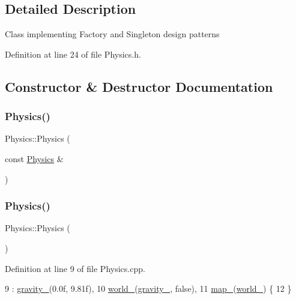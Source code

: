 \subsection{Detailed Description}
Class implementing Factory and Singleton design patterns 

Definition at line 24 of file Physics.\+h.



\subsection{Constructor \& Destructor Documentation}
\mbox{\label{classPhysics_a6fe4747c42265cefae8a24b9a2a291ad}} 
\subsubsection{\texorpdfstring{Physics()}{Physics()}\hspace{0.1cm}{\footnotesize\ttfamily [1/2]}}
{\footnotesize\ttfamily Physics\+::\+Physics (\begin{DoxyParamCaption}\item[{const \hyperlink{classPhysics}{Physics} \&}]{ }\end{DoxyParamCaption})\hspace{0.3cm}{\ttfamily [delete]}}

\mbox{\label{classPhysics_a4b2ebc0a344f04f48d227c72f0d0fbda}} 
\subsubsection{\texorpdfstring{Physics()}{Physics()}\hspace{0.1cm}{\footnotesize\ttfamily [2/2]}}
{\footnotesize\ttfamily Physics\+::\+Physics (\begin{DoxyParamCaption}{ }\end{DoxyParamCaption})\hspace{0.3cm}{\ttfamily [private]}}



Definition at line 9 of file Physics.\+cpp.


\begin{DoxyCode}
9                  : \hyperlink{classPhysics_a458f9e43685bda01b57e001b9793aed4}{gravity\_}(0.0f, 9.81f),
10                       \hyperlink{classPhysics_a6f9efee327d116528efb9fd16b405bc6}{world\_}(\hyperlink{classPhysics_a458f9e43685bda01b57e001b9793aed4}{gravity\_}, \textcolor{keyword}{false}),
11                       \hyperlink{classPhysics_a1f2b9c2d5ad391eff5e6ebd5cdf495fe}{map\_}(\hyperlink{classPhysics_a6f9efee327d116528efb9fd16b405bc6}{world\_}) \{
12 \}
\end{DoxyCode}


